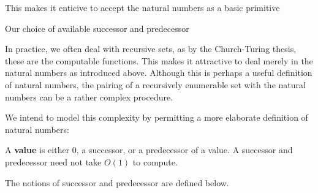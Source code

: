 







This makes it enticive to accept the natural numbers as a basic primitive


Our choice of available successor and predecessor

In practice, we often deal with recursive sets, as by the Church-Turing thesis,
these are  the computable functions. This makes it attractive to deal merely in
the natural numbers as introduced above. Although this is perhaps a useful
definition of natural numbers, the pairing of a recursively enumerable set with
the natural numbers can be a rather complex procedure.

We intend to model this complexity by permitting a more elaborate definition of
natural numbers:

\begin{notion}

A \textbf{value} is either $0$, a successor, or a predecessor of a value. A
successor and predecessor need not take $O(1)$ to compute.

\end{notion}

The notions of successor and predecessor are defined below.

